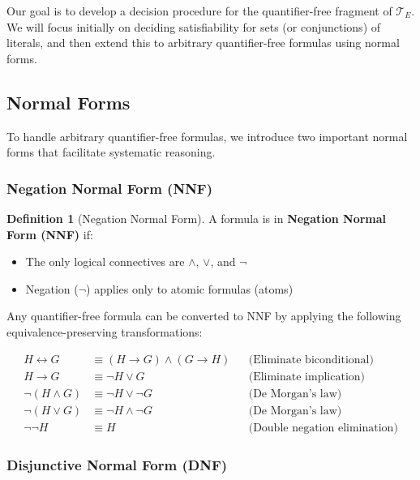 \documentclass[11pt,a4paper]{article}
\theoremstyle{definition}
\newtheorem{definition}{Definition}[section]
\theoremstyle{plain}
\theoremstyle{remark}
\begin{document}
Our goal is to develop a decision procedure for the quantifier-free fragment of $\mathcal{T}_E$. We will focus initially on deciding satisfiability for sets (or conjunctions) of literals, and then extend this to arbitrary quantifier-free formulas using normal forms.

\subsection{Normal Forms}

To handle arbitrary quantifier-free formulas, we introduce two important normal forms that facilitate systematic reasoning.

\subsubsection{Negation Normal Form (NNF)}

\begin{tcolorbox}[colback=cyan!5!white,colframe=cyan!75!black,title=\textbf{Negation Normal Form (NNF)}]
\begin{definition}[Negation Normal Form]
A formula is in \textbf{Negation Normal Form (NNF)} if:
\begin{itemize}
    \item The only logical connectives are $\wedge$, $\vee$, and $\neg$
    \item Negation ($\neg$) applies only to atomic formulas (atoms)
\end{itemize}
\end{definition}
\end{tcolorbox}

Any quantifier-free formula can be converted to NNF by applying the following equivalence-preserving transformations:

\begin{align*}
H \leftrightarrow G &\equiv (H \rightarrow G) \wedge (G \rightarrow H) && \text{(Eliminate biconditional)} \\
H \rightarrow G &\equiv \neg H \vee G && \text{(Eliminate implication)} \\
\neg (H \wedge G) &\equiv \neg H \vee \neg G && \text{(De Morgan's law)} \\
\neg (H \vee G) &\equiv \neg H \wedge \neg G && \text{(De Morgan's law)} \\
\neg \neg H &\equiv H && \text{(Double negation elimination)}
\end{align*}

\subsubsection{Disjunctive Normal Form (DNF)}
\end{document}
